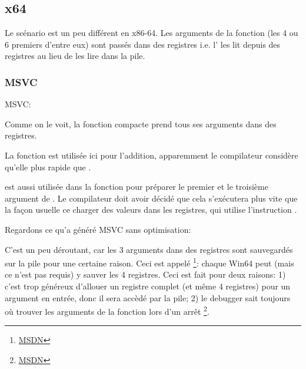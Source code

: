 \subsection{x64}


Le scénario est un peu différent en x86-64. Les arguments de la fonction (les 4 ou
6 premiers d'entre eux) sont passés dans des registres i.e. l'
les lit depuis des registres au lieu de les lire dans la pile.

\subsubsection{MSVC}

\Optimizing MSVC:



Comme on le voit, la fonction compacte \ttf prend tous ses arguments dans des registres.

La fonction \LEA est utilisée ici pour l'addition,
apparemment le compilateur considère qu'elle plus rapide que .

\LEA est aussi utilisée dans la fonction \main pour préparer le premier et le troisième
argument de \ttf. Le compilateur doit avoir décidé que cela s'exécutera plus vite
que la façon usuelle ce charger des valeurs dans les registres, qui utilise l'instruction
\MOV.

Regardons ce qu'a généré MSVC sans optimisation:



C'est un peu déroutant, car les 3 arguments dans des registres sont sauvegardés
sur la pile pour une certaine raison.
\label{shadow_space}
Ceci est appelé  %
\footnote{\href{http://go.yurichev.com/17256}{MSDN}}: 
chaque Win64 peut (mais ce n'est pas requis) y sauver les 4 registres. %
Ceci est fait pour deux raisons:
1) c'est trop généreux d'allouer un registre complet (et même 4 registres) pour
un argument en entrée, donc il sera accèdé par la pile;
2) le debugger sait toujours où trouver les arguments de la fonction lors d'un arrêt
\footnote{\href{http://go.yurichev.com/17257}{MSDN}}.

